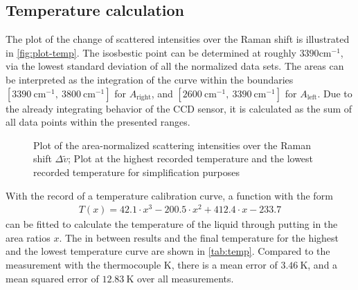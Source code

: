 
\subsection*{Temperature calculation}
\label{subsec:temp-eval}

The plot of the change of scattered intensities over the Raman shift is illustrated in \autoref{fig:plot-temp}. The isosbestic point can be determined at roughly $3390 \mathrm{cm^{-1}}$, via the lowest standard deviation of all the normalized data sets. The areas can be interpreted as the integration of the curve within the boundaries $[3390~\mathrm{cm^{-1}},~3800~\mathrm{cm^{-1}}]$ for $A_\mathrm{right}$, and $[2600~\mathrm{cm^{-1}},~3390~\mathrm{cm^{-1}}]$ for $A_\mathrm{left}$. Due to the already integrating behavior of the CCD sensor, it is calculated as the sum of all data points within the presented ranges.

\begin{figure}[!htb]
    \centering
    
    \caption[Area-normalized Raman shift intensities for the lowest and highest temperatures]{Plot of the area-normalized scattering intensities over the Raman shift $\Delta \tilde{v}$; Plot at the highest recorded temperature and the lowest recorded temperature for simplification purposes} 
    \label{fig:plot-temp}
\end{figure}

With the record of a temperature calibration curve, a function with the form
\begin{align}
    T(x)=42.1 \cdot x^3 - 200.5 \cdot x^2 + 412.4 \cdot x -233.7
\end{align}
can be fitted to calculate the temperature of the liquid through putting in the area ratios $x$. The in between results and the final temperature for the highest and the lowest temperature curve are shown in \autoref{tab:temp}. Compared to the measurement with the thermocouple K, there is a mean error of $3.46~\mathrm{K}$, and a mean squared error of $12.83~\mathrm{K}$ over all measurements.

